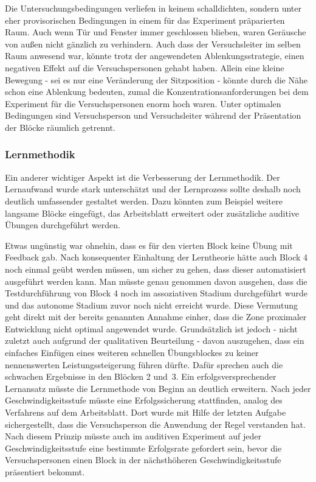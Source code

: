 \documentclass[doc,a4paper,12pt]{apa6}
\begin{document}
Die Untersuchungsbedingungen verliefen in keinem schalldichten, sondern unter eher provisorischen Bedingungen in einem für das Experiment präparierten Raum. Auch wenn Tür und Fenster immer geschlossen blieben, waren Geräusche von außen nicht gänzlich zu verhindern. Auch dass der Versuchsleiter im selben Raum anwesend war, könnte trotz der angewendeten Ablenkungsstrategie, einen negativen Effekt auf die Versuchspersonen gehabt haben. Allein eine kleine Bewegung - sei es nur eine Veränderung der Sitzposition - könnte durch die Nähe schon eine Ablenkung bedeuten, zumal die Konzentrationsanforderungen bei dem Experiment für die Versuchspersonen enorm hoch waren. Unter optimalen Bedingungen sind Versuchsperson und Versuchsleiter während der Präsentation der Blöcke räumlich getrennt.

\subsubsection{Lernmethodik}

Ein anderer wichtiger Aspekt ist die Verbesserung der Lernmethodik. Der Lernaufwand wurde stark unterschätzt und der Lernprozess sollte deshalb noch deutlich umfassender gestaltet werden. Dazu könnten zum Beispiel weitere langsame Blöcke eingefügt, das Arbeitsblatt erweitert oder zusätzliche auditive Übungen durchgeführt werden.

Etwas ungünstig war ohnehin, dass es für den vierten Block keine Übung mit Feedback gab. Nach konsequenter Einhaltung der Lerntheorie hätte auch Block 4 noch einmal geübt werden müssen, um sicher zu gehen, dass dieser automatisiert ausgeführt werden kann. Man müsste genau genommen davon ausgehen, dass die Testdurchführung von Block 4 noch im assoziativen Stadium durchgeführt wurde und das autonome Stadium zuvor noch nicht erreicht wurde. Diese Vermutung geht direkt mit der bereits genannten Annahme einher, dass die Zone proximaler Entwicklung \parencite{kozulin2003vygotsky} nicht optimal angewendet wurde. Grundsätzlich ist jedoch - nicht zuletzt auch aufgrund der qualitativen Beurteilung - davon auszugehen, dass ein einfaches Einfügen eines weiteren schnellen Übungsblockes zu keiner nennenswerten Leistungssteigerung führen dürfte. Dafür sprechen auch die schwachen Ergebnisse in den Blöcken 2 und~3. Ein erfolgsversprechender Lernansatz müsste die Lernmethode von Beginn an deutlich erweitern. Nach jeder Geschwindigkeitsstufe müsste eine Erfolgssicherung stattfinden, analog des Verfahrens auf dem Arbeitsblatt. Dort wurde mit Hilfe der letzten Aufgabe sichergestellt, dass die Versuchsperson die Anwendung der Regel verstanden hat. Nach diesem Prinzip müsste auch im auditiven Experiment auf jeder Geschwindigkeitsstufe eine bestimmte Erfolgsrate gefordert sein, bevor die Versuchspersonen einen Block in der nächsthöheren Geschwindigkeitsstufe präsentiert bekommt.
\end{document}

